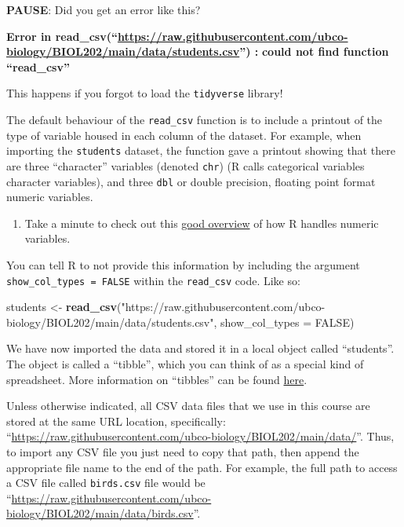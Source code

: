 \documentclass[
]{book}
\newenvironment{Shaded}{\begin{snugshade}}{\end{snugshade}}
\newcommand{\AttributeTok}[1]{\textcolor[rgb]{0.13,0.29,0.53}{#1}}
\newcommand{\ConstantTok}[1]{\textcolor[rgb]{0.56,0.35,0.01}{#1}}
\newcommand{\FunctionTok}[1]{\textcolor[rgb]{0.13,0.29,0.53}{\textbf{#1}}}
\newcommand{\NormalTok}[1]{#1}
\newcommand{\OtherTok}[1]{\textcolor[rgb]{0.56,0.35,0.01}{#1}}
\newcommand{\StringTok}[1]{\textcolor[rgb]{0.31,0.60,0.02}{#1}}
\providecommand{\tightlist}{%
  \setlength{\itemsep}{0pt}\setlength{\parskip}{0pt}}
\begin{document}
\textbf{PAUSE}: Did you get an error like this?

\textbf{Error in read\_csv(``\url{https://raw.githubusercontent.com/ubco-biology/BIOL202/main/data/students.csv}'') : }
\textbf{could not find function ``read\_csv''}

This happens if you forgot to load the \texttt{tidyverse} library!

The default behaviour of the \texttt{read\_csv} function is to include a printout of the type of variable housed in each column of the dataset. For example, when importing the \texttt{students} dataset, the function gave a printout showing that there are three ``character'' variables (denoted \texttt{chr}) (R calls categorical variables character variables), and three \texttt{dbl} or double precision, floating point format numeric variables.

\begin{enumerate}
\def\labelenumi{\arabic{enumi}.}
\tightlist
\item
  Take a minute to check out this \href{https://www.burns-stat.com/documents/tutorials/impatient-r/more-r-key-objects/more-r-numbers/}{good overview} of how R handles numeric variables.
\end{enumerate}

You can tell R to not provide this information by including the argument \texttt{show\_col\_types\ =\ FALSE} within the \texttt{read\_csv} code. Like so:

\begin{Shaded}
\begin{Highlighting}[]
\NormalTok{students }\OtherTok{\textless{}{-}} \FunctionTok{read\_csv}\NormalTok{(}\StringTok{"https://raw.githubusercontent.com/ubco{-}biology/BIOL202/main/data/students.csv"}\NormalTok{,}
                     \AttributeTok{show\_col\_types =} \ConstantTok{FALSE}\NormalTok{)}
\end{Highlighting}
\end{Shaded}

We have now imported the data and stored it in a local object called ``students''. The object is called a ``tibble'', which you can think of as a special kind of spreadsheet. More information on ``tibbles'' can be found \href{https://r4ds.had.co.nz/tibbles.html}{here}.

Unless otherwise indicated, all CSV data files that we use in this course are stored at the same URL location, specifically: ``\url{https://raw.githubusercontent.com/ubco-biology/BIOL202/main/data/}''. Thus, to import any CSV file you just need to copy that path, then append the appropriate file name to the end of the path. For example, the full path to access a CSV file called \texttt{birds.csv} file would be ``\url{https://raw.githubusercontent.com/ubco-biology/BIOL202/main/data/birds.csv}''.
\end{document}
